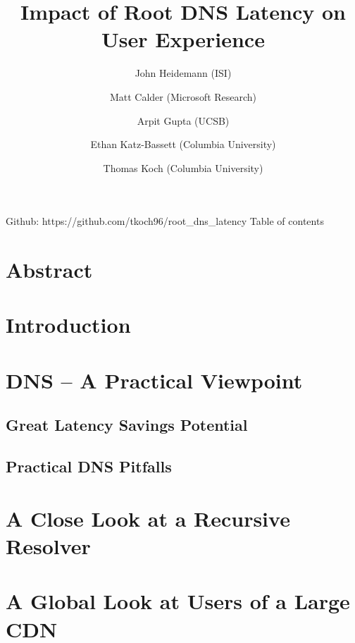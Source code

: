\documentclass[sigconf,nonacm,10pt]{acmart}
\title{Impact of Root DNS Latency on User Experience}
\author{
            John Heidemann (ISI)
         \and 
            Matt Calder (Microsoft Research)
         \and 
            Arpit Gupta (UCSB)
         \and 
            Ethan Katz-Bassett (Columbia University)
         \and 
            Thomas Koch (Columbia University)
        }
\date{}
\begin{document}
\maketitle

\iffalse

Github: https://github.com/tkoch96/root\_dns\_latency Table of contents

\section*{Abstract}\label{abstract}

\section{Introduction}\label{introduction}

\section{DNS -- A Practical Viewpoint}\label{dns-a-practical-viewpoint}

\subsection{Great Latency Savings
Potential}\label{great-latency-savings-potential}

\subsection{Practical DNS Pitfalls}\label{practical-dns-pitfalls}

\section{A Close Look at a Recursive
Resolver}\label{a-close-look-at-a-recursive-resolver}

\section{A Global Look at Users of a Large
CDN}\label{a-global-look-at-users-of-a-large-cdn}
\end{document}

